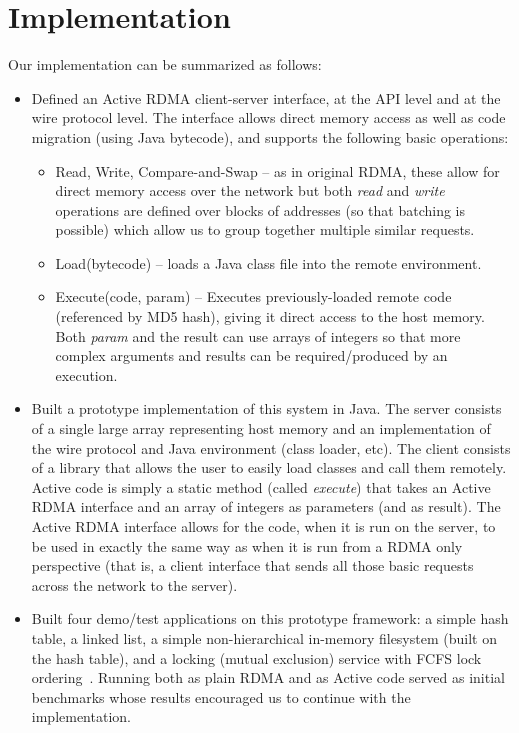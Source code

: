 \documentclass[10pt]{article}
\begin{document}
\section{Implementation}


Our implementation can be summarized as follows:

\begin{itemize}
\item Defined an Active RDMA client-server interface, at the API level
  and at the wire protocol level. The interface allows direct memory
  access as well as code migration (using Java bytecode), and supports
  the following basic operations:
  \begin{itemize}
  \item Read, Write, Compare-and-Swap -- as in original RDMA, these
    allow for direct memory access over the network but both \textit{read}
    and \textit{write} operations are defined over blocks of addresses (so
    that batching is possible) which allow us to group together multiple similar requests.
  \item Load(bytecode) -- loads a Java class file into the remote
    environment.
  \item Execute(code, param) -- Executes previously-loaded remote code
    (referenced by MD5 hash), giving it direct access to the host
    memory. Both \textit{param} and the result can use arrays of integers so that more complex arguments and results can be required/produced by an execution. 
  \end{itemize}
\item Built a prototype implementation of this system in Java. The
  server consists of a single large array representing host memory and
  an implementation of the wire protocol and Java environment (class
  loader, etc). The client consists of a library that allows the user
  to easily load classes and call them remotely. Active code is simply a static method (called \textit{execute}) that takes an Active RDMA interface and an array of integers as parameters (and as result). The Active RDMA interface allows for the code, when it is run on the server, to be used in exactly the same way as when it is run from a RDMA only perspective (that is, a client interface that sends all those basic requests across the network to the server). 
\item Built four demo/test applications on this prototype framework: a
  simple hash table, a linked list, a simple non-hierarchical
  in-memory filesystem (built on the hash table), and a locking
  (mutual exclusion) service with FCFS lock
  ordering~\cite{nic-basedatomic}. Running both as plain RDMA and as Active code served as initial benchmarks whose results encouraged us to continue with the implementation. 



\end{itemize}
\end{document}

